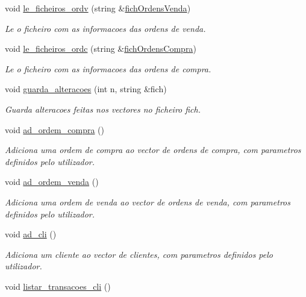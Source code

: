 \begin{DoxyCompactItemize}
void \hyperlink{class_bolsa_ab0cd2fab3d7490d5d4a431e5cb1106e6}{le\+\_\+ficheiros\+\_\+ordv} (string \&\hyperlink{_utils_8h_ad22902af7efe6d185550055b7caa5cbb}{fich\+Ordens\+Venda})
\begin{DoxyCompactList}\small\item\em Le o ficheiro com as informacoes das ordens de venda. \end{DoxyCompactList}\item 
void \hyperlink{class_bolsa_a57e3864eac22b2690e04fb8be39b5e58}{le\+\_\+ficheiros\+\_\+ordc} (string \&\hyperlink{_utils_8h_acaee3ba642d3be244820a97e5eb5b7f7}{fich\+Ordens\+Compra})
\begin{DoxyCompactList}\small\item\em Le o ficheiro com as informacoes das ordens de compra. \end{DoxyCompactList}\item 
void \hyperlink{class_bolsa_a12c0a8faf58b0803228ed17022c6ecfe}{guarda\+\_\+alteracoes} (int n, string \&fich)
\begin{DoxyCompactList}\small\item\em Guarda alteracoes feitas nos vectores no ficheiro fich. \end{DoxyCompactList}\item 
void \hyperlink{class_bolsa_a6567e62d4d1037ca2e2263ba7e22ea4e}{ad\+\_\+ordem\+\_\+compra} ()
\begin{DoxyCompactList}\small\item\em Adiciona uma ordem de compra ao vector de ordens de compra, com parametros definidos pelo utilizador. \end{DoxyCompactList}\item 
void \hyperlink{class_bolsa_ab028d3fd8537fa65b25c7eece82dfabc}{ad\+\_\+ordem\+\_\+venda} ()
\begin{DoxyCompactList}\small\item\em Adiciona uma ordem de venda ao vector de ordens de venda, com parametros definidos pelo utilizador. \end{DoxyCompactList}\item 
void \hyperlink{class_bolsa_a8bcc217341ffe40e4f2b6d7454977d4d}{ad\+\_\+cli} ()
\begin{DoxyCompactList}\small\item\em Adiciona um cliente ao vector de clientes, com parametros definidos pelo utilizador. \end{DoxyCompactList}\item 
void \hyperlink{class_bolsa_ad96a358bf03c103f55b8139da8a0d61a}{listar\+\_\+transacoes\+\_\+cli} ()

\end{DoxyCompactItemize}
